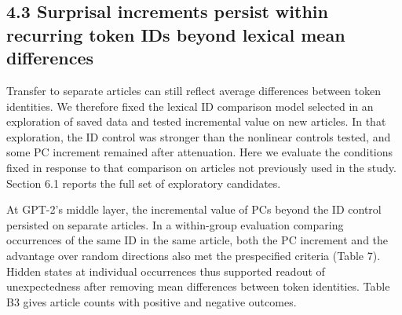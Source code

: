 \FloatBarrier

\subsection{4.3 Surprisal increments persist within recurring token IDs beyond lexical mean differences}\label{surprisal-increments-persist-within-recurring-token-ids-beyond-lexical-mean-differences}

Transfer to separate articles can still reflect average differences between token identities. We therefore fixed the lexical ID comparison model selected in an exploration of saved data and tested incremental value on new articles. In that exploration, the ID control was stronger than the nonlinear controls tested, and some PC increment remained after attenuation. Here we evaluate the conditions fixed in response to that comparison on articles not previously used in the study. Section 6.1 reports the full set of exploratory candidates.

At GPT-2's middle layer, the incremental value of PCs beyond the ID control persisted on separate articles. In a within-group evaluation comparing occurrences of the same ID in the same article, both the PC increment and the advantage over random directions also met the prespecified criteria (Table 7). Hidden states at individual occurrences thus supported readout of unexpectedness after removing mean differences between token identities. Table B3 gives article counts with positive and negative outcomes.

